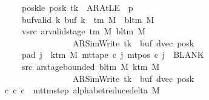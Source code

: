 \begin{isabellebody}
\ \ \ \ \ \ \ poskle{\isacharcolon}{\kern0pt}\ {\isachardoublequoteopen}posk\ tk\ {\isacharequal}{\kern0pt}\ AR{\isacharunderscore}{\kern0pt}AtLE\ {\isasymlongleftrightarrow}\ p\ {\isacharequal}{\kern0pt}\ {}{\isachardoublequoteclose}\isanewline
\ \ \ \ \ \ \ buf{\isacharunderscore}{\kern0pt}valid{\isacharcolon}{\kern0pt}\ {\isachardoublequoteopen}{\isasymforall}k{\isachardot}{\kern0pt}\ buf\ k\ {\isasymin}\ {\isasymGamma}{\isacharunderscore}{\kern0pt}tm\ M\ {\isasymunion}\ {\isacharbraceleft}{\kern0pt}bl{\isacharunderscore}{\kern0pt}tm\ M{\isacharbraceright}{\kern0pt}{\isachardoublequoteclose}\isanewline
\ \ \ \ \ \ \ vsrc{\isacharcolon}{\kern0pt}\ {\isachardoublequoteopen}ar{\isacharunderscore}{\kern0pt}valid{\isacharunderscore}{\kern0pt}stage\ {\isacharparenleft}{\kern0pt}{\isasymGamma}{\isacharunderscore}{\kern0pt}tm\ M{\isacharparenright}{\kern0pt}\ {\isacharparenleft}{\kern0pt}bl{\isacharunderscore}{\kern0pt}tm\ M{\isacharparenright}{\kern0pt}\isanewline
\ \ \ \ \ \ \ \ \ \ \ \ \ \ \ \ \ \ \ {\isacharparenleft}{\kern0pt}AR{\isacharunderscore}{\kern0pt}SimWrite{\isacharcomma}{\kern0pt}\ tk{\isacharcomma}{\kern0pt}\ {}{\isacharcomma}{\kern0pt}\ buf{\isacharcomma}{\kern0pt}\ dvec{\isacharcomma}{\kern0pt}\ posk{\isacharparenright}{\kern0pt}{\isachardoublequoteclose}\isanewline
\ \ \ \ \ \ \ pad{}{\isacharcolon}{\kern0pt}\ {\isachardoublequoteopen}{\isasymforall}j\ {\isasymge}\ k{\isacharunderscore}{\kern0pt}tm\ M{\isachardot}{\kern0pt}\ mt{\isacharunderscore}{\kern0pt}tape\ c{\isacharprime}{\kern0pt}\ j\ {\isacharparenleft}{\kern0pt}mt{\isacharunderscore}{\kern0pt}pos\ c{\isacharprime}{\kern0pt}\ j{\isacharparenright}{\kern0pt}\ {\isacharequal}{\kern0pt}\ BLANK{}{\isachardoublequoteclose}\isanewline
\ \ \ \ \ \ \ src{}{\isacharcolon}{\kern0pt}\ {\isachardoublequoteopen}ar{\isacharunderscore}{\kern0pt}stage{\isacharunderscore}{\kern0pt}bounded\ {\isacharparenleft}{\kern0pt}bl{\isacharunderscore}{\kern0pt}tm\ M{\isacharparenright}{\kern0pt}\ {\isacharparenleft}{\kern0pt}k{\isacharunderscore}{\kern0pt}tm\ M{\isacharparenright}{\kern0pt}\isanewline
\ \ \ \ \ \ \ \ \ \ \ \ \ \ \ \ \ \ \ {\isacharparenleft}{\kern0pt}AR{\isacharunderscore}{\kern0pt}SimWrite{\isacharcomma}{\kern0pt}\ tk{\isacharcomma}{\kern0pt}\ {}{\isacharcomma}{\kern0pt}\ buf{\isacharcomma}{\kern0pt}\ dvec{\isacharcomma}{\kern0pt}\ posk{\isacharparenright}{\kern0pt}{\isachardoublequoteclose}\isanewline
\ \ \ {\isachardoublequoteopen}{\isasymexists}c{\isacharprime}{\kern0pt}{\isacharprime}{\kern0pt}{\isachardot}{\kern0pt}\ {\isacharparenleft}{\kern0pt}c{\isacharprime}{\kern0pt}{\isacharcomma}{\kern0pt}\ c{\isacharprime}{\kern0pt}{\isacharprime}{\kern0pt}{\isacharparenright}{\kern0pt}\ {\isasymin}\ {\isacharparenleft}{\kern0pt}mttm{\isacharunderscore}{\kern0pt}step\ {\isacharparenleft}{\kern0pt}alphabet{\isacharunderscore}{\kern0pt}reduce{\isacharunderscore}{\kern0pt}delta\ M{\isacharparenright}{\kern0pt}{\isacharparenright}{\kern0pt}\isanewline

\end{isabellebody}
